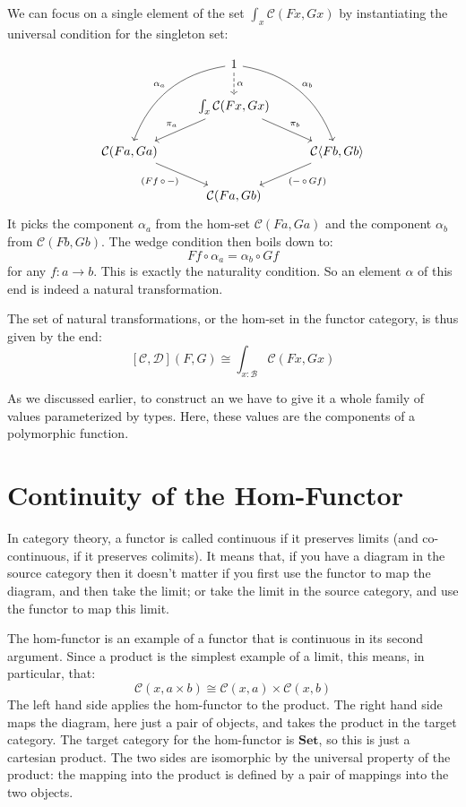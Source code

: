 \documentclass[DaoFP]{subfiles}
\begin{document}
We can focus on a single element of the set $\int_{x} \mathcal{C}(F x, G x)$ by instantiating the universal condition for the singleton set:

\[
 \begin{tikzcd}
 & 1
 \arrow[d, dashed, "\alpha"]
\arrow[ddl, bend right, "\alpha_a"']
 \arrow[ddr, bend left, "\alpha_b"]
 \\
 & \int_{x} \mathcal{C}(F x, G x)
 \arrow[ld, "\pi_a"']
 \arrow[rd, "\pi_b"]
 \\
  \mathcal{C} ( F a, G a )
 \arrow[dr, "{(F f \, \circ \, -)}"']
 && \mathcal{C} \langle F b, G b \rangle
 \arrow[dl, "{(- \, \circ\, G f)}"]
 \\
 &  \mathcal{C} ( F a, G b )
 \end{tikzcd}
\]
It picks the component $\alpha_a$ from the hom-set $\mathcal{C} ( F a, G a )$ and the component $\alpha_b$ from $\mathcal{C} ( F b, G b )$. The wedge condition then boils down to:
\[ F f \circ \alpha_a = \alpha_b \circ G f \]
for any $f \colon a \to b$. This is exactly the naturality condition. So an element $\alpha$ of this end is indeed a natural transformation.

The set of natural transformations, or the hom-set in the functor category, is thus given by the end:
\[ [\mathcal{C}, \mathcal{D}] (F, G) \cong \int_{x \colon  \mathcal{B}} \mathcal{C}(F x, G x)\]

As we discussed earlier, to construct an  we have to give it a whole family of values parameterized by types. Here, these values are the components of a polymorphic function. 

\section{Continuity of the Hom-Functor}

In category theory, a functor is called continuous if it preserves limits (and co-continuous, if it preserves colimits). It means that, if you have a diagram in the source category then it doesn't matter if you first use the functor to map the diagram, and then take the limit; or take the limit in the source category, and use the functor to map this limit. 

The hom-functor is an example of a functor that is continuous in its second argument. Since a product is the simplest example of a limit, this means, in particular, that:
\[ \mathcal{C}(x, a \times b) \cong \mathcal{C}(x, a) \times \mathcal{C}(x, b) \]
The left hand side applies the hom-functor to the product. The right hand side maps the diagram, here just a pair of objects, and takes the product in the target category. The target category for the hom-functor is $\mathbf{Set}$, so this is just a cartesian product. The two sides are isomorphic by the universal property of the product: the mapping into the product is defined by a pair of mappings into the two objects. 
\end{document}
